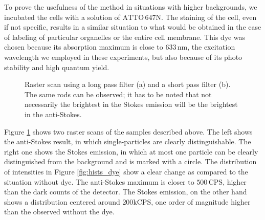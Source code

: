\documentclass[journal=nalefd,manuscript=letter]{achemso}
\newcommand{\nm}{\ensuremath{\,\textrm{nm}}}
\newcommand{\CPS}{\ensuremath{\,\textrm{CPS}}}
\newcommand{\atto}{\ensuremath{\textrm{ATTO}\,647\textrm{N}}}
\begin{document}
To prove the usefulness of the method in situations with higher
backgrounds, we incubated the cells with a solution of \atto.
The staining of the cell, even if not specific, results in a similar situation
to what would be obtained in the case of labeling of particular organelles or
the entire cell membrane. This dye was chosen because its absorption maximum is
close to $633\nm$, the excitation wavelength we employed in these
experiments, but also because of its photo stability and high quantum yield.

\begin{figure}[htp]
\centering
	\caption{Raster scan using a long pass filter (a) and a short pass filter (b).
	The same rods can be observed; it has to be noted that not necessarily the
	brightest in the Stokes emission will be the brightest in the anti-Stokes.}
	\label{fig:Stokes_AS_with_dye}
\end{figure}

Figure \ref{fig:Stokes_AS_with_dye} shows two raster scans of the samples
described above. The left shows the anti-Stokes result, in which
single-particles are clearly distinguishable. The right one shows the Stokes
emission, in which at most one particle can be clearly distinguished from the
background and is marked with a circle. The distribution of intensities in
Figure \ref{fig:hists_dye} show a clear change as compared to the situation without
dye. The anti-Stokes maximum is closer to $500\CPS$, higher than
the dark counts of the detector. The Stokes emission, on the other hand shows a
distribution centered around $200\textrm{kCPS}$, one order of
magnitude higher than the observed without the dye.
\end{document}
